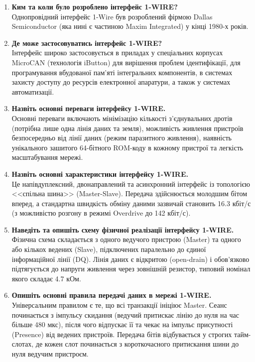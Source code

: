 \documentclass[14pt, a4paper]{extreport}
\begin{document}
	\begin{enumerate}
		\item \textbf{Ким та коли було розроблено інтерфейс 1-WIRE?} \\ Однопровідний інтерфейс 1-Wire був розроблений фірмою Dallas Semiconductor (яка нині є частиною Maxim Integrated) у кінці 1980-х років.
		
		\item \textbf{Де може застосовуватись інтерфейс 1-WIRE?} \\ Інтерфейс широко застосовується в приладах у спеціальних корпусах MicroCAN (технологія iButton) для вирішення проблем ідентифікації, для програмування вбудованої пам'яті інтегральних компонентів, в системах захисту доступу до ресурсів електронної апаратури, а також у системах автоматизації.
		
		\item \textbf{Назвіть основні переваги інтерфейсу 1-WIRE.} \\ Основні переваги включають мінімізацію кількості з'єднувальних дротів (потрібна лише одна лінія даних та земля), можливість живлення пристроїв безпосередньо від лінії даних (режим паразитного живлення), наявність унікального зашитого 64-бітного ROM-коду в кожному пристрої та легкість масштабування мережі.
		
		\item \textbf{Назвіть основні характеристики інтерфейсу 1-WIRE.} \\ Це напівдуплексний, двонаправлений та асинхронний інтерфейс із топологією <<спільна шина>> (Master-Slave). Передача здійснюється молодшим бітом вперед, а стандартна швидкість обміну даними зазвичай становить 16.3 кбіт/с (з можливістю розгону в режимі Overdrive до 142 кбіт/с).
		
		\item \textbf{Наведіть та опишіть схему фізичної реалізації інтерфейсу 1-WIRE.} \\ Фізична схема складається з одного ведучого пристрою (Master) та одного або кількох ведених (Slave), підключених паралельно до єдиної інформаційної лінії (DQ). Лінія даних є відкритою (open-drain) і обов'язково підтягується до напруги живлення через зовнішній резистор, типовий номінал якого складає 4.7 кОм.
		
		\item \textbf{Опишіть основні правила передачі даних в мережі 1-WIRE.} \\ Універсальним правилом є те, що всі транзакції ініціює Master. Сеанс починається з імпульсу скидання (ведучий притискає лінію до нуля на час більше 480 мкс), після чого відпускає її та чекає на імпульс присутності (Presence) від ведених пристроїв. Передача бітів відбувається у строгих тайм-слотах, де кожен слот починається з короткочасного притискання шини до нуля ведучим пристроєм.
		

\end{enumerate}
\end{document}
